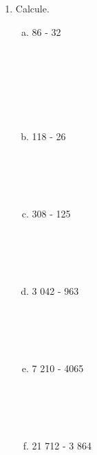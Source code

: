 \documentclass[a4paper,14pt]{article}
\begin{document}
\begin{multicols}{2}
\begin{enumerate}
\begin{enumerate}[a)]
				\item 2 834 + 3 762 \\\\\\\\\\
				\item 15 083 + 7 232 \\\\\\\\\\
				\item 672 + 453 + 1 204 \\\\\\\\\\
			\end{enumerate}
			\item Calcule.
			\begin{enumerate}[a)]
				\item 86 - 32 \\\\\\\\\\\\\\
				\item 118 - 26 \\\\\\\\\\
				\item 308 - 125 \\\\\\\\\\
				\item 3 042 - 963 \\\\\\\\\\
				\item 7 210 - 4065 \\\\\\\\\\
				\item 21 712 - 3 864 \\\\\\\\\\

\end{enumerate}
\end{enumerate}
\end{multicols}
\end{document}
